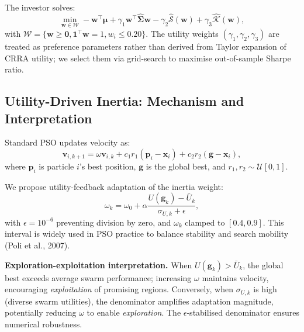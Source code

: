 \documentclass[12pt,a4paper]{article}
\begin{document}
	The investor solves:
	\begin{equation}
	\min_{\mathbf{w}\in\mathcal{W}} -\mathbf{w}^{\top}\boldsymbol{\mu}
	+\gamma_1\mathbf{w}^{\top}\hat{\boldsymbol{\Sigma}}\mathbf{w}
	-\gamma_2\hat{\mathcal{S}}(\mathbf{w})
	+\gamma_3\hat{\mathcal{K}}(\mathbf{w}),
	\label{eq:objective}
	\end{equation}
	with $\mathcal{W}=\{\mathbf{w}\ge\mathbf{0},\mathbf{1}^{\top}\mathbf{w}=1,w_i\le0.20\}$. The utility weights $(\gamma_1,\gamma_2,\gamma_3)$ are treated as preference parameters rather than derived from Taylor expansion of CRRA utility; we select them via grid-search to maximise out-of-sample Sharpe ratio.
	
	\subsection{Utility-Driven Inertia: Mechanism and Interpretation}
	
	Standard PSO updates velocity as:
	\begin{equation}
	\mathbf{v}_{i,k+1}=\omega\mathbf{v}_{i,k}+c_1r_1(\mathbf{p}_i-\mathbf{x}_i)+c_2r_2(\mathbf{g}-\mathbf{x}_i),
	\end{equation}
	where $\mathbf{p}_i$ is particle $i$'s best position, $\mathbf{g}$ is the global best, and $r_1,r_2\sim\mathcal{U}[0,1]$.
	
	We propose utility-feedback adaptation of the inertia weight:
	\begin{equation}
	\omega_k=\omega_0+\alpha\frac{U(\mathbf{g}_k)-\bar{U}_k}{\sigma_{U,k}+\epsilon},
	\label{eq:omega}
	\end{equation}
	with $\epsilon=10^{-6}$ preventing division by zero, and $\omega_k$ clamped to $[0.4,0.9]$. This interval is widely used in PSO practice to balance stability and search mobility (Poli et al., 2007).
	
	\textbf{Exploration-exploitation interpretation.} When $U(\mathbf{g}_k)>\bar{U}_k$, the global best exceeds average swarm performance; increasing $\omega$ maintains velocity, encouraging \textit{exploitation} of promising regions. Conversely, when $\sigma_{U,k}$ is high (diverse swarm utilities), the denominator amplifies adaptation magnitude, potentially reducing $\omega$ to enable \textit{exploration}. The $\epsilon$-stabilised denominator ensures numerical robustness.
	
\end{document}
